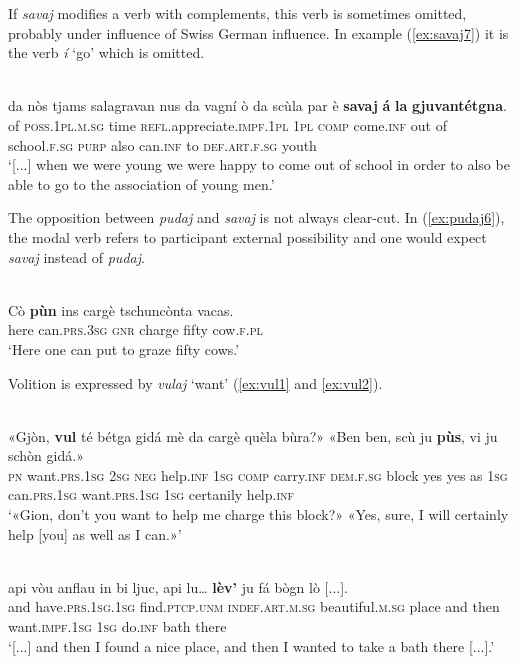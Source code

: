 If \textit{savaj} modifies a verb with complements, this verb is sometimes omitted, probably under influence of Swiss German influence. In example (\ref{ex:savaj7}) it is the verb \textit{í} `go' which is omitted.

\ea
\label{ex:savaj7}
\\
	\gll [...] da nòs tjams salagravan nus da vagní ò da scùla par è \textbf{savaj} \textbf{á} \textbf{la} \textbf{gjuvantétgna}.\\
 {} of \textsc{ poss.1pl.m.sg} time \textsc{refl}.appreciate.\textsc{impf.1pl} \textsc{1pl} \textsc{comp} come.\textsc{inf} out of school.\textsc{f.sg} \textsc{purp} also can.\textsc{inf} to \textsc{def.art.f.sg} youth\\
\glt `[...] when we were young we were happy to come out of school in order to also be able to go to the association of young men.'
\z

The opposition between \textit{pudaj} and \textit{savaj} is not always clear-cut. In (\ref{ex:pudaj6}), the modal verb refers to participant external possibility and one would expect \textit{savaj} instead of \textit{pudaj}.

\ea
\label{ex:pudaj6}
\\
\gll   Cò \textbf{pùn} ins cargè tschuncònta vacas.\\
here can.\textsc{prs.3sg} \textsc{gnr} charge fifty cow.\textsc{f.pl}\\
\glt `Here one can put to graze fifty cows.'
\z
                               
Volition is expressed by \textit{vulaj} `want' (\ref{ex:vul1} and \ref{ex:vul2}). 

\ea
\label{ex:vul1}
\\
\gll    «Gjòn, \textbf{vul} té bétga gidá mè da cargè quèla bùra?» «Ben ben, scù ju \textbf{pùs}, vi ju schòn gidá.»\\
\textsc{pn} want.\textsc{prs.1sg} \textsc{2sg} \textsc{neg} help.\textsc{inf} \textsc{1sg} \textsc{comp} carry.\textsc{inf} \textsc{dem.f.sg} block yes yes as \textsc{1sg} can.\textsc{prs.1sg} want.\textsc{prs.1sg} \textsc{1sg} certanily help.\textsc{inf}\\ 
\glt `«Gion, don’t you want to help me charge this block?» «Yes, sure, I will certainly help [you] as well as I can.»'
\z

\ea
\label{ex:vul2}
\\
\gll  [...] api vòu anflau in bi ljuc, api lu… \textbf{lèv’} ju fá bògn lò [...].\\
{} and have.\textsc{prs.1sg.1sg} find.\textsc{ptcp.unm} \textsc{indef.art.m.sg} beautiful.\textsc{m.sg} place and then want.\textsc{impf.1sg} \textsc{1sg} do.\textsc{inf} bath there\\
\glt `[...] and then I found a nice place, and then I wanted to take a bath there [...].'
\z

